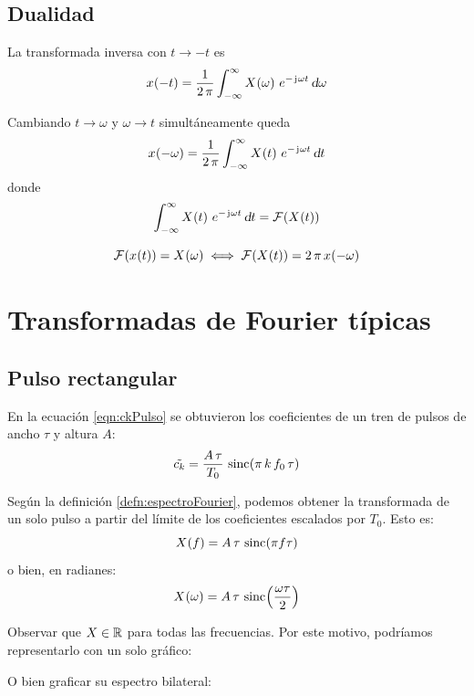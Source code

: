 \subsection{Dualidad}

La transformada inversa con $t \longrightarrow -t$ es
\[
    \fx[x]{-t}
    = \frac{1}{2 \, \pi}
    \int_{-\infty}^\infty \fx[X]{\omega} \, e^{- \iu \omega t}
    \, \dif \omega
\]

Cambiando $t \longrightarrow \omega$ y $\omega \longrightarrow t$ simultáneamente queda
\[
    \fx[x]{-\omega}
    = \frac{1}{2 \, \pi}
    \int_{-\infty}^\infty \fx[X]{t} \, e^{- \iu \omega t}
    \, \dif t
\]
donde
\[
    \int_{-\infty}^\infty \fx[X]{t} \, e^{- \iu \omega t}
    \, \dif t
    = \fourier{\fx[X]{t}}
\]

\begin{mdframed}[style=PropertyFrame]
    \begin{prop}
    \end{prop}
    \[
        \fourier{\fx[x]{t}} = \fx[X]{\omega}
        \iff
        \fourier{\fx[X]{t}} = 2 \, \pi \, \fx[x]{-\omega}
    \]
\end{mdframed}

\section{Transformadas de Fourier típicas}

\subsection{Pulso rectangular}

En la ecuación \ref{eqn:ckPulso} se obtuvieron los coeficientes de un tren de pulsos de ancho $\tau$ y altura $A$:
\[
    \tilde{c_\kth} = \frac{A \, \tau}{T_0} \, \fx[\sinc]{\pi \, \kth \, f_0 \, \tau}
\]

Según la definición \ref{defn:espectroFourier}, podemos obtener la transformada de un solo pulso a partir del límite de los coeficientes escalados por $T_0$.
Esto es:
\[
    \fx[X]{f} = A \, \tau \, \fx[\sinc]{\pi f \tau}
\]
o bien, en radianes:
\[
    \fx[X]{\omega} = A \, \tau \, \fx[\sinc]{\frac{\omega \tau}{2}}
\]

Observar que $X \in \setR$ para todas las frecuencias.
Por este motivo, podríamos representarlo con un solo gráfico:


O bien graficar su espectro bilateral:

